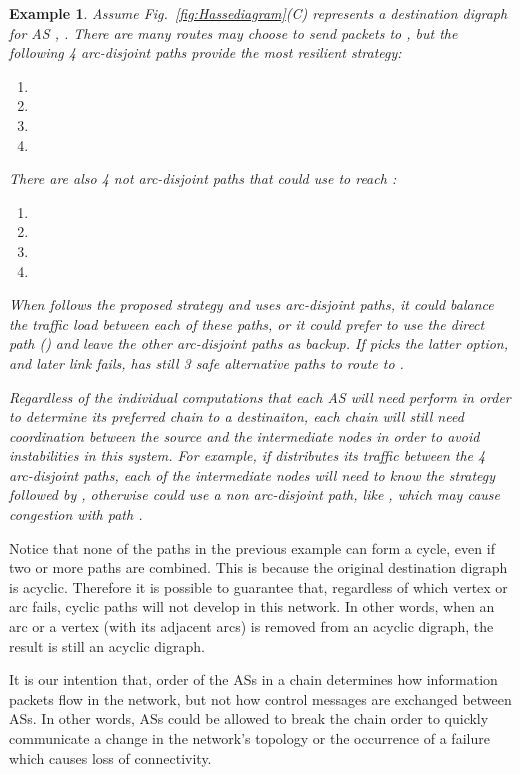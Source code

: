 \documentclass[5p,twocolumn]{elsarticle}
\newtheorem{example}{Example}
\begin{document}
\begin{example}
Assume Fig.\ \ref{fig:Hassediagram}(C) represents a destination digraph for AS , . There are many routes  may choose to send packets to , but the following 4 arc-disjoint paths provide the most resilient strategy:

\begin{enumerate}
	\item 
	\item 
	\item 
	\item 
\end{enumerate}

There are also 4 not arc-disjoint paths that  could use to reach :

\begin{enumerate}
	\item 
	\item 
	\item 
	\item 
\end{enumerate}

When  follows the proposed strategy and uses arc-disjoint paths, it could balance the traffic load between each of these paths, or it could prefer to use the direct path () and leave the other arc-disjoint paths as backup. If  picks the latter option, and later link  fails,  has still 3 safe alternative paths to route to .

Regardless of the individual computations that each AS will need perform in order to determine its preferred chain to a destinaiton, each chain will still need coordination between the source and the intermediate nodes in order to avoid instabilities in this system. For example, if  distributes its traffic between the 4 arc-disjoint paths, each of the intermediate nodes will need to know the strategy followed by , otherwise  could use a non arc-disjoint path, like , which may cause congestion with path .
\end{example}

Notice that none of the paths in the previous example can form a cycle, even if two or more paths are combined. This is because the original destination digraph is acyclic. Therefore it is possible to guarantee that, regardless of which vertex or arc fails, cyclic paths will not develop in this network. In other words, when an arc or a vertex (with its adjacent arcs) is removed from an acyclic digraph, the result is still an acyclic digraph.

It is our intention that, order of the ASs in a chain determines how information packets flow in the network, but not how control messages are exchanged between ASs. In other words, ASs could be allowed to break the chain order to quickly communicate a change in the network's topology or the occurrence of a failure which causes loss of connectivity.
\end{document}
